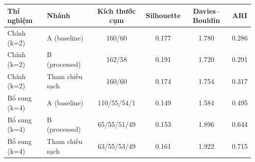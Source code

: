 \begin{tabular}{llcccc}
\toprule
Thí nghiệm & Nhánh & Kích thước cụm & Silhouette & Davies–Bouldin & ARI \\
\midrule
Chính (k=2) & A (baseline) & 160/60 & 0.177 & 1.780 & 0.286 \\
Chính (k=2) & B (processed) & 162/58 & 0.191 & 1.720 & 0.291 \\
Chính (k=2) & Tham chiếu sạch & 160/60 & 0.174 & 1.754 & 0.317 \\
Bổ sung (k=4) & A (baseline) & 110/55/54/1 & 0.149 & 1.584 & 0.495 \\
Bổ sung (k=4) & B (processed) & 65/55/51/49 & 0.153 & 1.896 & 0.644 \\
Bổ sung (k=4) & Tham chiếu sạch & 63/55/53/49 & 0.161 & 1.922 & 0.715 \\
\bottomrule
\end{tabular}
